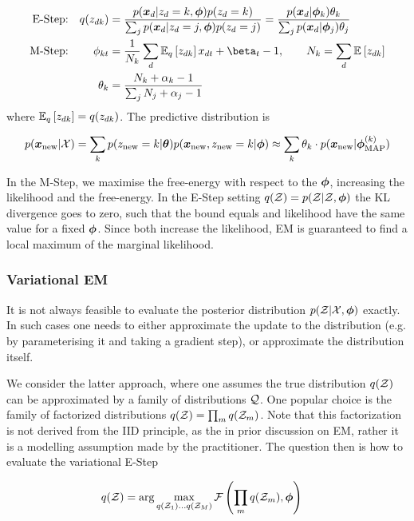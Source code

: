 \begin{align}
\text{E-Step:} & & q(z_{dk}) 
& = \frac{p(\xd|z_d = k, \param)p(z_d = k)}{\sum_j p(\xd|z_d = j, \param)p(z_d = j)} 
= \frac{p(\xd | \param_k) \theta_k}{\sum_j p(\xd | \param_j) \theta_j} \label{eqn:estep} \\
\text{M-Step:} 
& & \phi_{kt} & = \frac{1}{N_k} \sum_d \ex{z_{dk}}{q} x_{dt} + \beta_t - 1, \qquad N_k = \sum_d \ex{z_{dk}}{} \\
& & \theta_k & =  \frac{N_k + \alpha_k - 1}{\sum_j N_j + \alpha_j - 1} \label{eqn:mstep}
\end{align}
where $\ex{z_{dk}}{q} = q(z_{dk})$. The predictive distribution is

\begin{align}
p(\xnew | \xdat)  = \sum_k p(z_{\text{new}} = k | \vv{\theta}) p(\xnew, z_{\text{new}} = k | \param) 
\approx \sum_k \theta_k \cdot p(\xnew | \param^{(k)}_{\text{MAP}})
\end{align}

In the M-Step, we maximise the free-energy with respect to the $\param$, increasing the likelihood and the free-energy. In the E-Step setting $q(\zdat) = p(\zdat|\zdat, \param)$ the KL divergence goes to zero, such that the bound equals and likelihood have the same value for a fixed  $\param$. Since both increase the likelihood, EM is guaranteed to find a local maximum of the marginal likelihood.


\subsubsection*{Variational EM}
It is not always feasible to evaluate the posterior distribution $p(\zdat|\xdat, \param)$ exactly. In such cases one needs to either approximate the update to the distribution (e.g. by parameterising it and taking a gradient step), or approximate the distribution itself.

We consider the latter approach, where one assumes the true distribution $q(\zdat)$ can be approximated by a family of distributions $\qfam$. One popular choice is the family of factorized distributions $q(\zdat) = \prod_m q(\zdat_m)$. Note that this factorization is not derived from the IID principle, as the in prior discussion on EM, rather it is a modelling assumption made by the practitioner. The question then is how to evaluate the variational E-Step

\begin{align}
q(\zdat) & = \arg \max_{q(\zdat_1) \ldots q(\zdat_M)} \fqt{\prod_m q(\zdat_m), \param}
\end{align}

